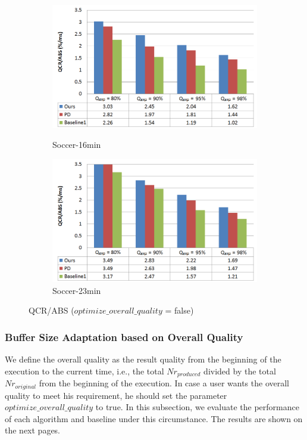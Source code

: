\documentclass[a4paper, 11pt, twoside]{report}
\begin{document}
\begin{figure}[H]
	\centering
	\begin{subfigure}[t]{5in}
		\centering
		\includegraphics[width=5in]{QCR_ABS-16min}
		\caption{Soccer-16min}
		\hspace{5pt}
		\includegraphics[width=5in]{QCR_ABS-23min}
		\caption{Soccer-23min}	
	\end{subfigure}
	\caption{QCR/ABS ($optimize\_overall\_quality$ = false)}
	\label{fig:qcr/abs}
\end{figure}



\subsubsection{Buffer Size Adaptation based on Overall Quality}
\label{subsec:optimize-overall-quality}

We define the overall quality as the result quality from the beginning of the execution to the current time, i.e., the total $Nr_{produced}$ divided by the total $Nr_{original}$ from the beginning of the execution. In case a user wants the overall quality to meet his requirement, he should set the parameter $optimize\_overall\_quality$ to true. In this subsection, we evaluate the performance of each algorithm and baseline under this circumstance. The results are shown on the next pages.\\
\end{document}
